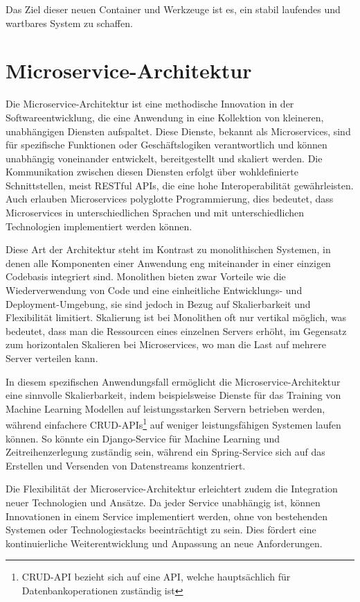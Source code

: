 Das Ziel dieser neuen Container und Werkzeuge ist es, ein stabil laufendes und wartbares System zu schaffen.


\section{Microservice-Architektur}
Die Microservice-Architektur ist eine methodische Innovation in der Softwareentwicklung, die eine Anwendung in eine Kollektion von kleineren, unabhängigen Diensten aufspaltet. 
Diese Dienste, bekannt als Microservices, sind für spezifische Funktionen oder Geschäftslogiken verantwortlich und können unabhängig voneinander entwickelt, bereitgestellt und skaliert werden. 
Die Kommunikation zwischen diesen Diensten erfolgt über wohldefinierte Schnittstellen, meist RESTful APIs, die eine hohe Interoperabilität gewährleisten. 
Auch erlauben Microservices polyglotte Programmierung, dies bedeutet, dass Microservices in unterschiedlichen Sprachen und mit unterschiedlichen Technologien implementiert werden können.


Diese Art der Architektur steht im Kontrast zu monolithischen Systemen, in denen alle Komponenten einer Anwendung eng miteinander in einer einzigen Codebasis integriert sind. 
Monolithen bieten zwar Vorteile wie die Wiederverwendung von Code und eine einheitliche Entwicklungs- und Deployment-Umgebung, sie sind jedoch in Bezug auf Skalierbarkeit und Flexibilität limitiert. 
Skalierung ist bei Monolithen oft nur vertikal möglich, was bedeutet, dass man die Ressourcen eines einzelnen Servers erhöht, im Gegensatz zum horizontalen Skalieren bei Microservices, wo man die Last auf mehrere Server verteilen kann.

In diesem spezifischen Anwendungsfall ermöglicht die Microservice-Architektur eine sinnvolle Skalierbarkeit, indem beispielsweise Dienste für das Training von Machine Learning Modellen auf leistungsstarken Servern betrieben werden, 
während einfachere CRUD-APIs\footnote{CRUD-API bezieht sich auf eine \ac{API}, welche hauptsächlich für Datenbankoperationen zuständig ist} auf weniger leistungsfähigen Systemen laufen können. 
So könnte ein Django-Service für Machine Learning und Zeitreihenzerlegung zuständig sein, während ein Spring-Service sich auf das Erstellen und Versenden von Datenstreams konzentriert.

Die Flexibilität der Microservice-Architektur erleichtert zudem die Integration neuer Technologien und Ansätze. Da jeder Service unabhängig ist, können Innovationen in einem Service implementiert werden, ohne von bestehenden Systemen oder Technologiestacks beeinträchtigt zu sein. 
Dies fördert eine kontinuierliche Weiterentwicklung und Anpassung an neue Anforderungen.

